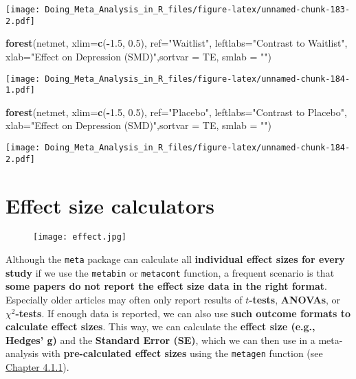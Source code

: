\documentclass[]{book}
\newenvironment{Shaded}{\begin{snugshade}}{\end{snugshade}}
\newcommand{\KeywordTok}[1]{\textcolor[rgb]{0.13,0.29,0.53}{\textbf{#1}}}
\newcommand{\DataTypeTok}[1]{\textcolor[rgb]{0.13,0.29,0.53}{#1}}
\newcommand{\FloatTok}[1]{\textcolor[rgb]{0.00,0.00,0.81}{#1}}
\newcommand{\StringTok}[1]{\textcolor[rgb]{0.31,0.60,0.02}{#1}}
\newcommand{\OperatorTok}[1]{\textcolor[rgb]{0.81,0.36,0.00}{\textbf{#1}}}
\newcommand{\NormalTok}[1]{#1}
\theoremstyle{definition}
\theoremstyle{definition}
\theoremstyle{definition}
\theoremstyle{remark}
\begin{document}
\texttt{[image: Doing\_Meta\_Analysis\_in\_R\_files/figure-latex/unnamed-chunk-183-2.pdf]}

\begin{Shaded}
\begin{Highlighting}[]
\KeywordTok{forest}\NormalTok{(netmet, }\DataTypeTok{xlim=}\KeywordTok{c}\NormalTok{(}\OperatorTok{-}\FloatTok{1.5}\NormalTok{, }\FloatTok{0.5}\NormalTok{), }\DataTypeTok{ref=}\StringTok{"Waitlist"}\NormalTok{, }\DataTypeTok{leftlabs=}\StringTok{"Contrast to Waitlist"}\NormalTok{, }\DataTypeTok{xlab=}\StringTok{"Effect on Depression (SMD)"}\NormalTok{,}\DataTypeTok{sortvar =}\NormalTok{ TE, }\DataTypeTok{smlab =} \StringTok{""}\NormalTok{)}
\end{Highlighting}
\end{Shaded}

\texttt{[image: Doing\_Meta\_Analysis\_in\_R\_files/figure-latex/unnamed-chunk-184-1.pdf]}

\begin{Shaded}
\begin{Highlighting}[]
\KeywordTok{forest}\NormalTok{(netmet, }\DataTypeTok{xlim=}\KeywordTok{c}\NormalTok{(}\OperatorTok{-}\FloatTok{1.5}\NormalTok{, }\FloatTok{0.5}\NormalTok{), }\DataTypeTok{ref=}\StringTok{"Placebo"}\NormalTok{, }\DataTypeTok{leftlabs=}\StringTok{"Contrast to Placebo"}\NormalTok{, }\DataTypeTok{xlab=}\StringTok{"Effect on Depression (SMD)"}\NormalTok{,}\DataTypeTok{sortvar =}\NormalTok{ TE, }\DataTypeTok{smlab =} \StringTok{""}\NormalTok{)}
\end{Highlighting}
\end{Shaded}

\texttt{[image: Doing\_Meta\_Analysis\_in\_R\_files/figure-latex/unnamed-chunk-184-2.pdf]}

\chapter{Effect size calculators}\label{effect-size-calculators}

\begin{figure}
\centering
\texttt{[image: effect.jpg]}
\caption{}
\end{figure}

Although the \texttt{meta} package can calculate all \textbf{individual
effect sizes for every study} if we use the \texttt{metabin} or
\texttt{metacont} function, a frequent scenario is that \textbf{some
papers do not report the effect size data in the right format}.
Especially older articles may often only report results of
\(t\)\textbf{-tests}, \textbf{ANOVAs}, or \(\chi^2\)\textbf{-tests}. If
enough data is reported, we can also use \textbf{such outcome formats to
calculate effect sizes}. This way, we can calculate the \textbf{effect
size (e.g., Hedges' g)} and the \textbf{Standard Error (SE)}, which we
can then use in a meta-analysis with \textbf{pre-calculated effect
sizes} using the \texttt{metagen} function (see
\protect\hyperlink{pre.calc}{Chapter 4.1.1}).
\end{document}
